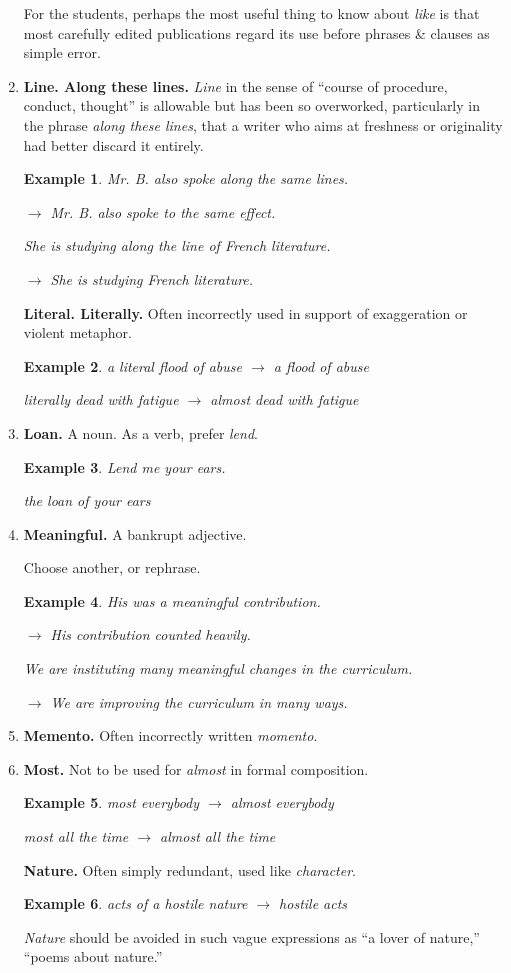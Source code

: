 \documentclass{article}
\newtheorem{example}{Example}
\begin{document}
\begin{enumerate}
	For the students, perhaps the most useful thing to know about {\it like} is that most carefully edited publications regard its use before phrases \& clauses as simple error.
	\item {\bf Line. Along these lines.} {\it Line} in the sense of ``course of procedure, conduct, thought'' is allowable but has been so overworked, particularly in the phrase {\it along these lines}, that a writer who aims at freshness or originality had better discard it entirely.
	\begin{example}
		Mr. B. also spoke along the same lines.
		
		$\to$ Mr. B. also spoke to the same effect.
		
		She is studying along the line of French literature.
		
		$\to$ She is studying French literature.
	\end{example}
	{\bf Literal. Literally.} Often incorrectly used in support of exaggeration or violent metaphor.
	\begin{example}
		a literal flood of abuse $\to$ a flood of abuse
		
		literally dead with fatigue $\to$ almost dead with fatigue
	\end{example}
	\item {\bf Loan.} A noun. As a verb, prefer {\it lend}.
	\begin{example}
		Lend me your ears.
		
		the loan of your ears
	\end{example}
	\item {\bf Meaningful.} A bankrupt adjective.
	
	Choose another, or rephrase.
	\begin{example}
		His was a meaningful contribution.
		
		$\to$ His contribution counted heavily.
		
		We are instituting many meaningful changes in the curriculum.
		
		$\to$ We are improving the curriculum in many ways.
	\end{example}
	\item {\bf Memento.} Often incorrectly written {\it momento}.
	\item {\bf Most.} Not to be used for {\it almost} in formal composition.
	\begin{example}
		most everybody $\to$ almost everybody
		
		most all the time $\to$ almost all the time
	\end{example}
	{\bf Nature.} Often simply redundant, used like {\it character}.
	\begin{example}
		acts of a hostile nature $\to$ hostile acts
	\end{example}
	{\it Nature} should be avoided in such vague expressions as ``a lover of nature,'' ``poems about nature.''
	

\end{enumerate}
\end{document}
